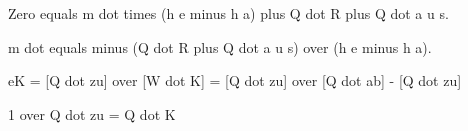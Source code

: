 Zero equals m dot times (h e minus h a) plus Q dot R plus Q dot a u s.

m dot equals minus (Q dot R plus Q dot a u s) over (h e minus h a).

eK = [Q dot zu] over [W dot K] = [Q dot zu] over [Q dot ab] - [Q dot zu]

1 over Q dot zu = Q dot K